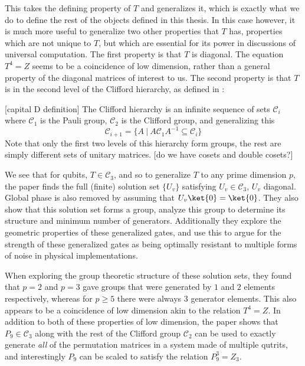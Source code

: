 This takes the defining property of $T$ and generalizes it, which is exactly what we do to define the rest of the objects defined in this thesis. In this case however, it is much more useful to generalize two other properties that $T$ has, properties which are not unique to $T$, but which are essential for its power in discussions of universal computation. The first property is that $T$ is diagonal. The equation $T^4 = Z$ seems to be a coincidence of low dimension, rather than a general property of the diagonal matrices of interest to us. The second property is that $T$ is in the second level of the Clifford hierarchy, as defined in \cite{clifford-hierarchy}:

[capital D definition] The Clifford hierarchy is an infinite sequence of sets $\mathcal{C}_i$ where $\mathcal{C}_1$ is the Pauli group, $\mathcal{C}_2$ is the Clifford group, and generalizing this
\[\mathcal{C}_{i+1} = \{A\ |\ A\mathcal{C}_1A^{-1} \subseteq \mathcal{C}_i\}\]
Note that only the first two levels of this hierarchy form groups, the rest are simply different sets of unitary matrices.
[do we have cosets and double cosets?]

We see that for qubits, $T \in \mathcal{C}_3$, and so to generalize $T$ to any prime dimension $p$, the paper \cite{pi-over-eight} finds the full (finite) solution set $\{U_v\}$ satisfying $U_v \in \mathcal{C}_3$, $U_v$ diagonal. Global phase is also removed by assuming that $U_v\ket{0} = \ket{0}$. They also show that this solution set forms a group, analyze this group to determine its structure and minimum number of generators. Additionally they explore the geometric properties of these generalized gates, and use this to argue for the strength of these generalized gates as being optimally resistant to multiple forms of noise in physical implementations.

When exploring the group theoretic structure of these solution sets, they found that $p = 2$ and $p = 3$ gave groups that were generated by $1$ and $2$ elements respectively, whereas for $p \geq 5$ there were always $3$ generator elements. This also appears to be a coincidence of low dimension akin to the relation $T^4 = Z$. In addition to both of these properties of low dimension, the paper \cite{arithmetics} shows that $P_9 \in \mathcal{C}_3$ along with the rest of the Clifford group $\mathcal{C}_2$ can be used to exactly generate \emph{all} of the permutation matrices in a system made of multiple qutrits, and interestingly $P_9$ can be scaled to satisfy the relation $P_9^3 = Z_3$.

